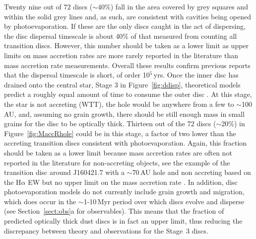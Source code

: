 \documentclass{rsos}
\begin{document}
Twenty nine out of 72 discs ($\sim$40\%) fall  in the area covered by grey squares and within the solid grey lines and, as such, are consistent with cavities being opened by photoevaporation. If these are the only discs caught in the act of dispersing, the disc dispersal timescale is about 40\% of that measured from counting all transition discs.
However, this number should be taken as a lower limit as upper limits on mass accretion rates are more rarely reported in the literature than mass accretion rate measurements. Overall these results confirm previous reports that the dispersal timescale is short, of order 10$^5$\,yrs. Once the inner disc has drained onto the central star, Stage 3 in Figure~\ref{fig:ddisp}, theoretical models predict a roughly equal amount of time to consume the outer disc 
\cite{2011MNRAS.412...13O}. At this stage, the star is not accreting (WTT), the hole would be anywhere from a few to $\sim$100\,AU, and, assuming no grain growth, there should be still enough mass in small grains for the disc to be optically thick. Thirteen out of the 72 discs ($\sim$20\%) in Figure~\ref{fig:MaccRhole} could be in this stage, a factor of two lower than the accreting transition discs consistent with photoevaporation. Again, this fraction should be taken as a lower limit because mass accretion rates are often not reported in the literature for non-accreting objects, see the example of the transition disc around J160421.7 with a $\sim$70\,AU hole and non accreting based on the H$\alpha$ EW but no upper limit on the mass accretion rate \cite{2016A&A...585A..58V}. In addition, disc photoevaporation models do not currently include grain growth and migration, which does occur in the $\sim$1-10\,Myr period over which discs evolve and disperse (see Section~\ref{sect:obs}a for observables). This means that the fraction of predicted optically thick dust discs is in fact an upper limit, thus reducing the discrepancy between theory and observations for the Stage~3 discs.
\end{document}
